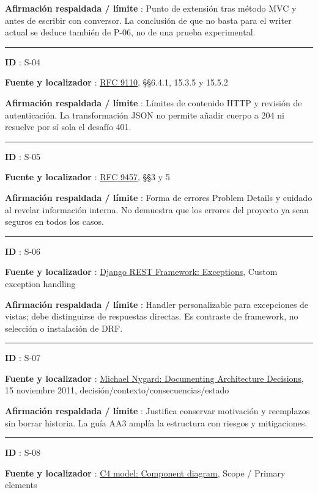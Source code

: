 \documentclass[12pt,a4paper]{report}
\begin{document}
\textbf{Afirmación respaldada / límite }: Punto de extensión tras método
MVC y antes de escribir con conversor. La conclusión de que no basta
para el writer actual se deduce también de P-06, no de una prueba
experimental.

\medskip\hrule\medskip

\textbf{ID }: S-04

\textbf{Fuente y localizador
}: \href{https://www.rfc-editor.org/rfc/rfc9110.html}{RFC 9110},
§§6.4.1, 15.3.5 y 15.5.2

\textbf{Afirmación respaldada / límite }: Límites de contenido HTTP y
revisión de autenticación. La transformación JSON no permite añadir
cuerpo a 204 ni resuelve por sí sola el desafío 401.

\medskip\hrule\medskip

\textbf{ID }: S-05

\textbf{Fuente y localizador
}: \href{https://www.rfc-editor.org/rfc/rfc9457.html}{RFC 9457}, §§3 y 5

\textbf{Afirmación respaldada / límite }: Forma de errores Problem
Details y cuidado al revelar información interna. No demuestra que los
errores del proyecto ya sean seguros en todos los casos.

\medskip\hrule\medskip

\textbf{ID }: S-06

\textbf{Fuente y localizador
}: \href{https://www.django-rest-framework.org/api-guide/exceptions/}{Django
REST Framework: Exceptions}, Custom exception handling

\textbf{Afirmación respaldada / límite }: Handler personalizable para
excepciones de vistas; debe distinguirse de respuestas directas. Es
contraste de framework, no selección o instalación de DRF.

\medskip\hrule\medskip

\textbf{ID }: S-07

\textbf{Fuente y localizador
}: \href{https://www.cognitect.com/blog/2011/11/15/documenting-architecture-decisions}{Michael
Nygard: Documenting Architecture Decisions}, 15 noviembre 2011,
decisión/contexto/consecuencias/estado

\textbf{Afirmación respaldada / límite }: Justifica conservar motivación
y reemplazos sin borrar historia. La guía AA3 amplía la estructura con
riesgos y mitigaciones.

\medskip\hrule\medskip

\textbf{ID }: S-08

\textbf{Fuente y localizador
}: \href{https://c4model.com/diagrams/component}{C4 model: Component
diagram}, Scope / Primary elements
\end{document}
